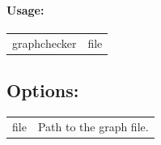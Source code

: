 \documentclass[11pt]{article}
\begin{document}
\paragraph*{Usage:\\} 
\begin{tabular}{ll}
graphchecker & file
\end{tabular}
\subsection*{Options:\\} 
\begin{tabularx}{\textwidth}{lX}
  file                       & Path to the graph file. \\
\end{tabularx}

\vfill
\pagebreak


\end{document}
